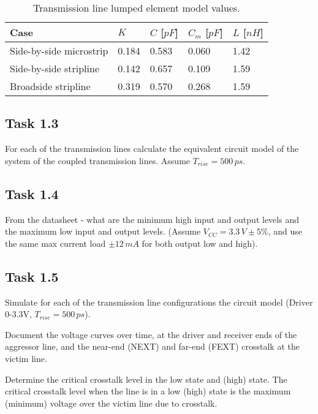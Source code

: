 \documentclass[../main.tex]{subfiles}
\begin{document}
\begin{table}[h]
    \centering
    \begin{tabular}{l|l l l l}
        \toprule[1pt]
        \textbf{Case} & $K$ & $C$ [$\si{pF}$] & $C_m$ [$\si{pF}$] & $L$ [$\si{nH}$] \\
        \midrule
        Side-by-side microstrip & 0.184 & 0.583 & 0.060 & 1.42 \\
        Side-by-side stripline  & 0.142 & 0.657 & 0.109 & 1.59 \\
        Broadside stripline     & 0.319 & 0.570 & 0.268 & 1.59 \\
        \bottomrule[1pt]
    \end{tabular}
    \caption{Transmission line lumped element model values.}
    \label{tab:tl-params}
\end{table}


\newpage

\subsection{Task 1.3}

For each of the transmission lines calculate the equivalent circuit model of the system of the coupled transmission lines. Assume $T_{rise} = 500\,\si{ps}$.

\solution

\subsection{Task 1.4}

From the datasheet - what are the minimum high input and output levels and the maximum low input and output levels. (Assume $V_{CC} = 3.3\,\si{V} \pm 5\%$, and use the same max current load $\pm 12 \,\si{mA}$ for both output low and high).

\solution

\subsection{Task 1.5}

Simulate for each of the transmission line configurations the circuit model (Driver 0-3.3V, $T_{rise} = 500\,\si{ps}$).

\vspace{10pt}
Document the voltage curves over time, at the driver and receiver ends of the aggressor line, and the near-end (NEXT) and far-end (FEXT) crosstalk at the victim line.

\vspace{10pt}
Determine the critical crosstalk level in the low state and (high) state. The critical crosstalk level when the line is in a low (high) state is the maximum (minimum) voltage over the victim line due to crosstalk.

\solution
\end{document}
